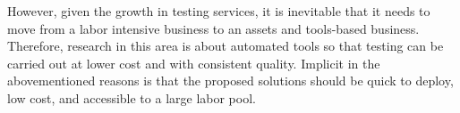 However, given the growth in testing services, it is inevitable that it needs to move from
a labor intensive business to an assets and tools-based business.  Therefore, 
research in this area is about automated tools so that 
testing can be carried out at lower cost and with consistent quality.  
Implicit in the abovementioned reasons is that the proposed solutions should be 
quick to deploy, low cost, and accessible to a large labor pool.




